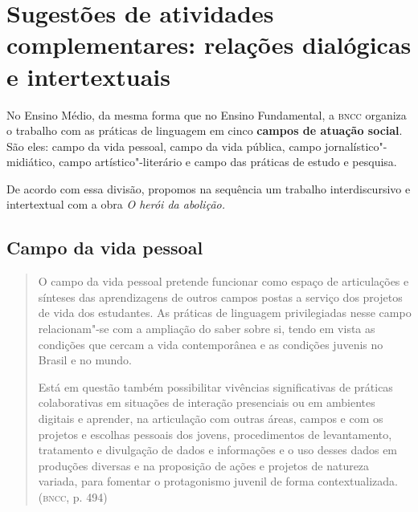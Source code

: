 \documentclass[12pt]{extarticle}
\begin{document}


\section{Sugestões de atividades complementares: relações dialógicas e
intertextuais}


No Ensino Médio, da mesma forma que no Ensino Fundamental, a \textsc{bncc}
organiza o trabalho com as práticas de linguagem em cinco \textbf{campos
de atuação social}. São eles: campo da vida pessoal, campo da vida
pública, campo jornalístico"-midiático, campo artístico"-literário e campo
das práticas de estudo e pesquisa.

De acordo com essa divisão, propomos na sequência um trabalho
interdiscursivo e intertextual com a obra \emph{O herói da abolição.}


\subsection{Campo da vida pessoal}

\begin{quote}
O campo da vida pessoal pretende funcionar como espaço de articulações
e sínteses das aprendizagens de outros campos postas a serviço dos
projetos de vida dos estudantes. As práticas de linguagem privilegiadas
nesse campo relacionam"-se com a ampliação do saber sobre si, tendo em
vista as condições que cercam a vida contemporânea e as condições
juvenis no Brasil e no mundo.

Está em questão também possibilitar vivências significativas de práticas
colaborativas em situações de interação presenciais ou em ambientes
digitais e aprender, na articulação com outras áreas, campos e com os
projetos e escolhas pessoais dos jovens, procedimentos de levantamento,
tratamento e divulgação de dados e informações e o uso desses dados em
produções diversas e na proposição de ações e projetos de natureza
variada, para fomentar o protagonismo juvenil de forma
contextualizada. (\textsc{bncc}, p. 494)
\end{quote}
\end{document}
